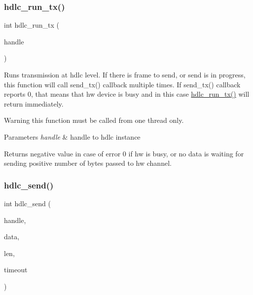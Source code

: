 \subsubsection{\texorpdfstring{hdlc\+\_\+run\+\_\+tx()}{hdlc\_run\_tx()}}
{\footnotesize\ttfamily int hdlc\+\_\+run\+\_\+tx (\begin{DoxyParamCaption}\item[{\hyperlink{group__HDLC__API_gabeaf7578aed5279d3af891bd85a9f961}{hdlc\+\_\+handle\+\_\+t}}]{handle }\end{DoxyParamCaption})}

Runs transmission at hdlc level. If there is frame to send, or send is in progress, this function will call send\+\_\+tx() callback multiple times. If send\+\_\+tx() callback reports 0, that means that hw device is busy and in this case \hyperlink{group__HDLC__API_gae31d921043b4f175603114c206b6b829}{hdlc\+\_\+run\+\_\+tx()} will return immediately.

\begin{DoxyWarning}{Warning}
this function must be called from one thread only.
\end{DoxyWarning}

\begin{DoxyParams}{Parameters}
{\em handle} & handle to hdlc instance \\
\hline
\end{DoxyParams}
\begin{DoxyReturn}{Returns}
negative value in case of error 0 if hw is busy, or no data is waiting for sending positive number of bytes passed to hw channel. 
\end{DoxyReturn}
\mbox{\label{group__HDLC__API_ga8b5cc456927145cebd82b2b560a6fa10}} 
\subsubsection{\texorpdfstring{hdlc\+\_\+send()}{hdlc\_send()}}
{\footnotesize\ttfamily int hdlc\+\_\+send (\begin{DoxyParamCaption}\item[{\hyperlink{group__HDLC__API_gabeaf7578aed5279d3af891bd85a9f961}{hdlc\+\_\+handle\+\_\+t}}]{handle,  }\item[{const void $\ast$}]{data,  }\item[{int}]{len,  }\item[{uint32\+\_\+t}]{timeout }\end{DoxyParamCaption})}


